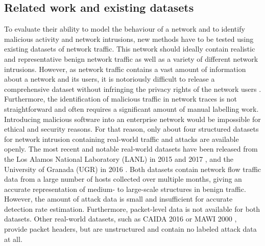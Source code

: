 \documentclass[sigconf]{acmart}
\begin{document}
\subsection{Related work and existing datasets}

To evaluate their ability to model the behaviour of a network and to identify malicious activity and network intrusions, new methods have to be tested using existing datasets of network traffic. This network should ideally contain realistic and representative benign network traffic as well as a variety of different network intrusions. However, as network traffic contains a vast amount of information about a network and its users, it is notoriously difficult to release a comprehensive dataset without infringing the privacy rights of the network users \cite{sperotto2009labeled}. Furthermore, the identification of malicious traffic in network traces is not straightforward and often requires a significant amount of manual labelling work. Introducing malicious software into an enterprise network would be impossible for ethical and security reasons. For that reason, only about four structured datasets for network intrusion containing real-world traffic and attacks are available openly. The most recent and notable real-world datasets have been released from the Los Alamos National Laboratory (LANL) in 2015 and 2017 \cite{akent-2015-enterprise-data, turcotte17}, and the University of Granada (UGR) in 2016 \cite{macia2018ugr}. Both datasets contain network flow traffic data from a large number of hosts collected over multiple months, giving an accurate representation of medium- to large-scale structures in benign traffic. However, the amount of attack data is small and insufficient for accurate detection rate estimation. Furthermore, packet-level data is not available for both datasets. Other real-world datasets, such as CAIDA 2016 \cite{walsworth2015caida} or MAWI 2000 \cite{sony2000traffic}, provide packet headers, but are unstructured and contain no labeled attack data at all.
\end{document}
